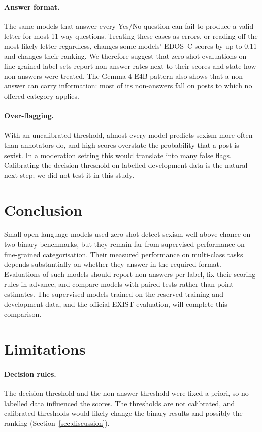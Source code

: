 \documentclass[11pt]{article}
\begin{document}
\paragraph{Answer format.} The same models that answer every Yes/No question can fail to produce a valid letter for most 11-way questions. Treating these cases as errors, or reading off the most likely letter regardless, changes some models' EDOS~C scores by up to 0.11 and changes their ranking. We therefore suggest that zero-shot evaluations on fine-grained label sets report non-answer rates next to their scores and state how non-answers were treated. The Gemma-4-E4B pattern also shows that a non-answer can carry information: most of its non-answers fall on posts to which no offered category applies.

\paragraph{Over-flagging.} With an uncalibrated threshold, almost every model predicts sexism more often than annotators do, and high scores overstate the probability that a post is sexist. In a moderation setting this would translate into many false flags. Calibrating the decision threshold on labelled development data is the natural next step; we did not test it in this study.

\section{Conclusion}\label{sec:conclusion}
Small open language models used zero-shot detect sexism well above chance on two binary benchmarks, but they remain far from supervised performance on fine-grained categorisation. Their measured performance on multi-class tasks depends substantially on whether they answer in the required format. Evaluations of such models should report non-answers per label, fix their scoring rules in advance, and compare models with paired tests rather than point estimates. The supervised models trained on the reserved training and development data, and the official EXIST evaluation, will complete this comparison.

\section{Limitations}\label{sec:limits}
\paragraph{Decision rules.} The decision threshold and the non-answer threshold were fixed a priori, so no labelled data influenced the scores. The thresholds are not calibrated, and calibrated thresholds would likely change the binary results and possibly the ranking (Section~\ref{sec:discussion}).
\end{document}
